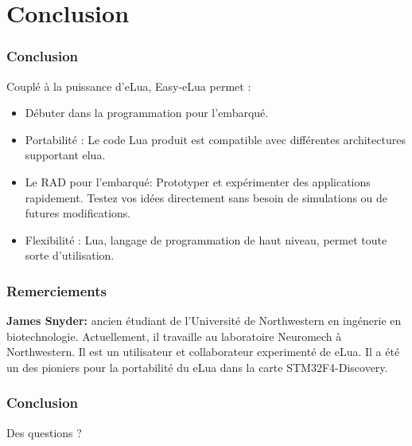\documentclass{beamer}
\begin{document}
\section{Conclusion}
\begin{frame}
\frametitle{Conclusion}
Couplé à la puissance d'eLua, Easy-eLua permet :
\begin{itemize}
\item Débuter dans la programmation pour l'embarqué.
\item Portabilité : Le code Lua produit est compatible avec différentes architectures supportant elua.
\item Le RAD pour l'embarqué: Prototyper et expérimenter des applications rapidement. Testez vos idées directement sans besoin de simulations ou de futures modifications.
\item Flexibilité : Lua, langage de programmation de haut niveau, permet toute sorte d'utilisation.
\end{itemize}
\end{frame}


\begin{frame}
\frametitle{Remerciements}

\textbf{James Snyder:} ancien étudiant de l'Université de Northwestern en ingénerie en biotechnologie. Actuellement, il travaille au laboratoire Neuromech 
à Northwestern. Il est un utilisateur et collaborateur experimenté de eLua. Il a été un des pioniers pour la portabilité du eLua
dans la carte STM32F4-Discovery.
\end{frame}

\begin{frame}
\frametitle{Conclusion}
\begin{center}
\huge{Des questions ?}
\end{center}
\end{frame}
\end{document}

